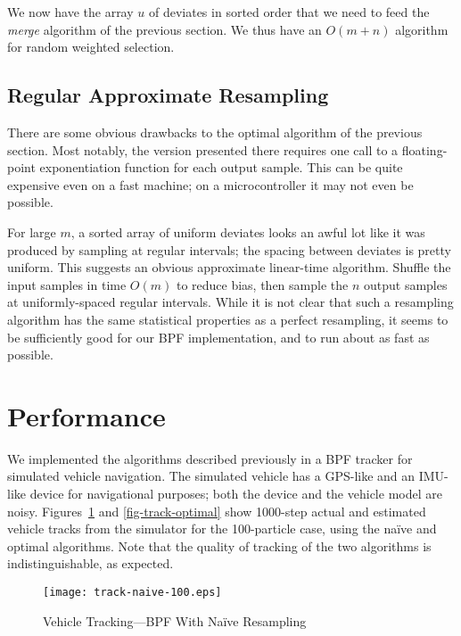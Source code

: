 \documentclass[12pt]{article}
\begin{document}
  We now have the array $u$ of deviates in sorted order that
  we need to feed the {\em merge} algorithm of the previous
  section.  We thus have an $O(m + n)$ algorithm for random
  weighted selection.

\subsection{Regular Approximate Resampling}\label{sec-regular}

  There are some obvious drawbacks to the optimal algorithm
  of the previous section.  Most notably, the version
  presented there requires one call to a floating-point
  exponentiation function for each output sample.  This can
  be quite expensive even on a fast machine; on a
  microcontroller it may not even be possible.

  For large $m$, a sorted array of uniform deviates looks an
  awful lot like it was produced by sampling at regular
  intervals; the spacing between deviates is pretty uniform.
  This suggests an obvious approximate linear-time
  algorithm. Shuffle the input samples in time $O(m)$ to
  reduce bias, then sample the $n$ output samples at
  uniformly-spaced regular intervals.  While it is not clear
  that such a resampling algorithm has the same statistical
  properties as a perfect resampling, it seems to be
  sufficiently good for our BPF implementation, and to run
  about as fast as possible.

\section{Performance}

  We implemented the algorithms described previously in a
  BPF tracker for simulated vehicle navigation.  The
  simulated vehicle has a GPS-like and an IMU-like device
  for navigational purposes; both the device and the vehicle
  model are noisy.  Figures~\ref{fig-track-naive} and
  \ref{fig-track-optimal} show 1000-step actual and estimated vehicle
  tracks from the simulator for the 100-particle case, using
  the na\"ive and optimal algorithms.  Note
  that the quality of tracking of the two algorithms is
  indistinguishable, as expected.

  \begin{figure}
    \centering
    \texttt{[image: track-naive-100.eps]}
    \caption{Vehicle Tracking---BPF With Na\"ive Resampling}\label{fig-track-naive}
  \end{figure}
\end{document}
